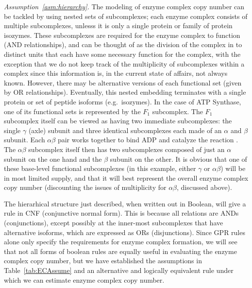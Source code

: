 \emph{Assumption~\ref{asm:hierarchy}.}
The modeling of enzyme complex copy number can be tackled by using
nested sets of subcomplexes; each enzyme complex consists of multiple
subcomplexes, unlesss it is only a single protein or family of protein
isozymes.  These subcomplexes are required for the enzyme complex to
function (AND relationships), and can be thought of as the division of
the complex in to distinct units that each have some necessary
function for the complex, with the exception that we do not keep track
of the multiplicity of subcomplexes within a complex since this
information is, in the current state of affairs, not always known.
However, there may be alternative versions of each functional set
(given by OR relationships). Eventually, this nested embedding
terminates with a single protein or set of peptide isoforms
(e.g.\ isozymes).  In the case of ATP Synthase, one of its functional
sets is represented by the $F_1$ subcomplex. The $F_1$ subcomplex
itself can be viewed as having two immediate subcomplexes: the single
$\gamma$ (axle) subunit and three identical subcomplexes each made of
an $\alpha$ and $\beta$ subunit. Each $\alpha\beta$ pair works
together to bind ADP and catalyze the reaction \citep{Oster2003}. The
$\alpha\beta$ subcomplex itself then has two subcomplexes composed of
just an $\alpha$ subunit on the one hand and the $\beta$ subunit on
the other.  It is obvious that one of these base-level functional
subcomplexes (in this example, either $\gamma$ or $\alpha\beta$) will
be in most limited supply, and that it will best represent the overall
enzyme complex copy number (discounting the issues of multiplicity for
$\alpha\beta$, discussed above).

%
%

The hierarhical structure just described, when written out in Boolean,
will give a rule in CNF (conjunctive normal form). This is because all
relations are ANDs (conjunctions), except possibly at the inner-most
subcomplexes that have alternative isoforms, which are expressed as
ORs (disjunctions). Since GPR rules alone only specify the
requirements for enzyme complex formation, we will see that not all
forms of boolean rules are equally useful in evaluating the enzyme
complex copy number, but we have established the assumptions in
Table~\ref{tab:ECAssume} and an alternative and logically equivalent rule
\citep{Russell2009} under which we can estimate enzyme complex copy
number.


